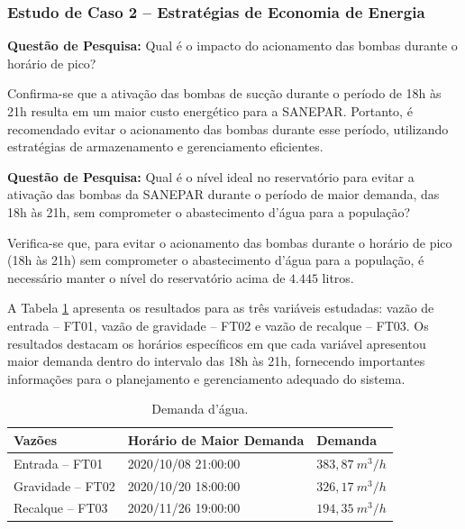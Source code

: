 \subsubsection{Estudo de Caso 2 -- Estrat\'egias de Economia de Energia}

\textbf{Questão de Pesquisa:} Qual é o impacto do acionamento das bombas durante o horário de pico?

Confirma-se que a ativação das bombas de sucção durante o período de 18h às 21h resulta em um maior custo energético para a SANEPAR. Portanto, é recomendado evitar o acionamento das bombas durante esse período, utilizando estratégias de armazenamento e gerenciamento eficientes.

\textbf{Questão de Pesquisa:} Qual é o nível ideal no reservatório para evitar a ativação das bombas da SANEPAR durante o período de maior demanda, das 18h às 21h, sem comprometer o abastecimento d'água para a população?

Verifica-se que, para evitar o acionamento das bombas durante o horário de pico (18h às 21h) sem comprometer o abastecimento d'água para a população, é necessário manter o nível do reservatório acima de $4.445$ litros.


A Tabela \ref{tb:dem} apresenta os resultados para as três variáveis estudadas: vazão de entrada -- FT01, vazão de gravidade -- FT02 e vazão de recalque -- FT03. Os resultados destacam os horários específicos em que cada variável apresentou maior demanda dentro do intervalo das 18h às 21h, fornecendo importantes informações para o planejamento e gerenciamento adequado do sistema.



\begin{table}[!htb]
	\centering
	\caption{Demanda d'água.}\label{tb:dem}
	\begin{tabular}{@{}lll@{}}
		\toprule
		\textbf{Vazões}         & \textbf{Horário de Maior Demanda} & \textbf{Demanda} \\ \midrule
		Entrada -- FT01   & 2020/10/08 21:00:00               & $383,87 \ m^3/h$                   \\
		Gravidade -- FT02 & 2020/10/20 18:00:00               & $326,17 \ m^3/h$                    \\
		Recalque -- FT03  & 2020/11/26 19:00:00               & $194,35 \ m^3/h$                    \\ \bottomrule
	\end{tabular}
	
	
\end{table}

